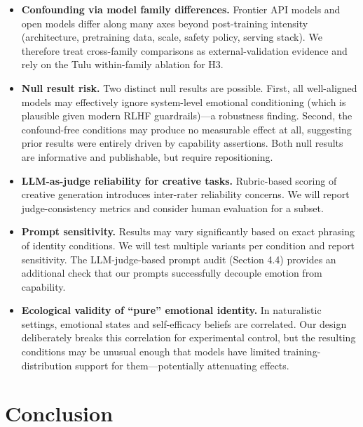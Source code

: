 \documentclass[11pt,a4paper]{article}
\begin{document}
\begin{itemize}
  \item \textbf{Confounding via model family differences.} Frontier API models and open models differ along many axes beyond post-training intensity (architecture, pretraining data, scale, safety policy, serving stack). We therefore treat cross-family comparisons as external-validation evidence and rely on the Tulu within-family ablation for H3.
  \item \textbf{Null result risk.} Two distinct null results are possible. First, all well-aligned models may effectively ignore system-level emotional conditioning (which is plausible given modern RLHF guardrails)—a robustness finding. Second, the confound-free conditions may produce no measurable effect at all, suggesting prior results were entirely driven by capability assertions. Both null results are informative and publishable, but require repositioning.
  \item \textbf{LLM-as-judge reliability for creative tasks.} Rubric-based scoring of creative generation introduces inter-rater reliability concerns. We will report judge-consistency metrics and consider human evaluation for a subset.
  \item \textbf{Prompt sensitivity.} Results may vary significantly based on exact phrasing of identity conditions. We will test multiple variants per condition and report sensitivity. The LLM-judge-based prompt audit (Section 4.4) provides an additional check that our prompts successfully decouple emotion from capability.
  \item \textbf{Ecological validity of ``pure'' emotional identity.} In naturalistic settings, emotional states and self-efficacy beliefs are correlated. Our design deliberately breaks this correlation for experimental control, but the resulting conditions may be unusual enough that models have limited training-distribution support for them—potentially attenuating effects.
\end{itemize}

\section{Conclusion}
\end{document}
